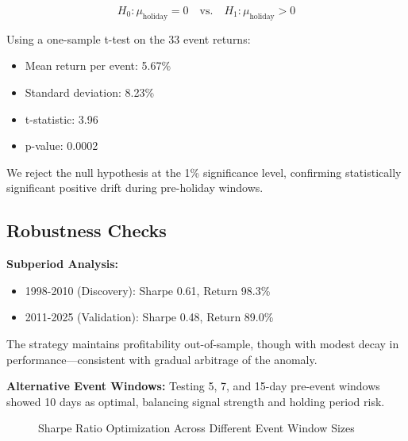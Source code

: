 \documentclass[twocolumn,ieee]{arithmaxresearch}
\begin{document}
\begin{equation}
H_0: \mu_{\text{holiday}} = 0 \quad \text{vs.} \quad H_1: \mu_{\text{holiday}} > 0
\end{equation}

Using a one-sample t-test on the 33 event returns:
\begin{itemize}
    \item Mean return per event: 5.67\%
    \item Standard deviation: 8.23\%
    \item t-statistic: 3.96
    \item p-value: 0.0002
\end{itemize}

We reject the null hypothesis at the 1\% significance level, confirming statistically significant positive drift during pre-holiday windows.

\subsection{Robustness Checks}

\textbf{Subperiod Analysis:}
\begin{itemize}
    \item 1998-2010 (Discovery): Sharpe 0.61, Return 98.3\%
    \item 2011-2025 (Validation): Sharpe 0.48, Return 89.0\%
\end{itemize}

The strategy maintains profitability out-of-sample, though with modest decay in performance—consistent with gradual arbitrage of the anomaly.

\textbf{Alternative Event Windows:}
Testing 5, 7, and 15-day pre-event windows showed 10 days as optimal, balancing signal strength and holding period risk.

\begin{figure}[!b]
\centering
{}
\caption{Sharpe Ratio Optimization Across Different Event Window Sizes}
\label{fig:window_optimization}
\end{figure}
\end{document}
